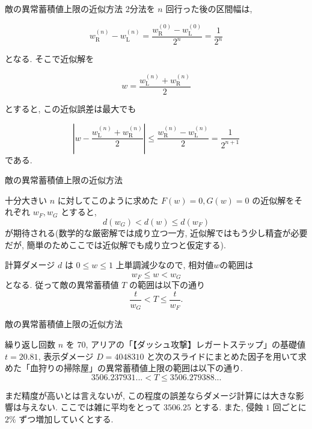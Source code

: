 \documentclass[aspectratio=169]{beamer}
\begin{document}
\begin{frame}{敵の異常蓄積値上限の近似方法}
\small
2分法を $n$ 回行った後の区間幅は,

\[
w_{\mathrm{R}}^{(n)}-w_{\mathrm{L}}^{(n)}
=
\frac{
w_{\mathrm{R}}^{(0)}-w_{\mathrm{L}}^{(0)}
}{
2^n
}
=
\frac{1}{2^n}
\]

となる.
そこで近似解を

\[
w
=
\frac{
w_{\mathrm{L}}^{(n)}+w_{\mathrm{R}}^{(n)}
}{
2
}
\]

とすると, この近似誤差は最大でも

\[
\left|
w-
\frac{
w_{\mathrm{L}}^{(n)}+w_{\mathrm{R}}^{(n)}
}{
2
}
\right|
\le
\frac{
w_{\mathrm{R}}^{(n)}-w_{\mathrm{L}}^{(n)}
}{
2
}
=
\frac{1}{2^{n+1}}
\]
である.

\end{frame}
\begin{frame}{敵の異常蓄積値上限の近似方法}

十分大きい $n$ に対してこのように求めた $F(w)=0,G(w)=0$ の近似解をそれぞれ $w_{F}, w_{G}$ とすると, \[
d(w_{G}) < d(w) \le d(w_{F})
\]
が期待される(数学的な厳密解では成り立つ一方, 近似解ではもう少し精査が必要だが, 簡単のためここでは近似解でも成り立つと仮定する).

計算ダメージ $d$ は  $0 \le w \le 1$ 上単調減少なので, 相対値$w$の範囲は 
\[
w_{F}\le w < w_{G}
\]
となる. 
従って敵の異常蓄積値 $T$ の範囲は以下の通り
\[
\frac{t}{w_{G}}< T \le \frac{t}{w_{F}}.
\]

\end{frame}

\begin{frame}{敵の異常蓄積値上限の近似方法}

繰り返し回数 $n$ を $70$, アリアの「【ダッシュ攻撃】レガートステップ」の基礎値 $t=20.81$, 表示ダメージ $D=4048310$ と次のスライドにまとめた因子を用いて求めた「血狩りの掃除屋」の異常蓄積値上限の範囲は以下の通り.
\[
3506.237931...
<
T
\le
3506.279388...
\]

まだ精度が高いとは言えないが, この程度の誤差ならダメージ計算には大きな影響は与えない.
ここでは雑に平均をとって $3506.25$ とする.
また, 侵蝕 $1$ 回ごとに $2\%$ ずつ増加していくとする.
\end{frame}
\end{document}

